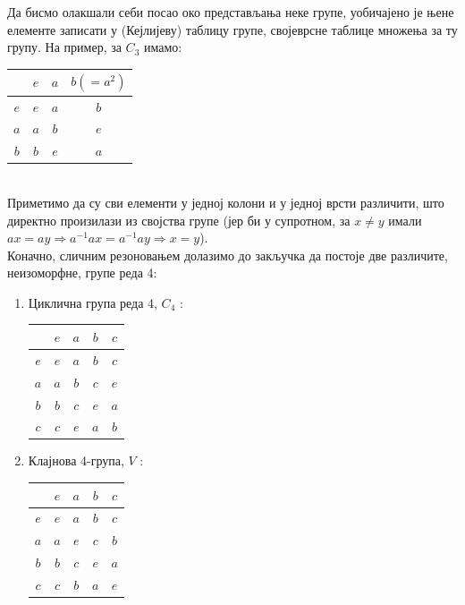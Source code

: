 \documentclass{report}
\theoremstyle{plain}
\theoremstyle{definition}
\begin{document}
Да бисмо олакшали себи посао око представљања неке групе, уобичајено је њене елементе записати у (Кејлијеву) таблицу групе, својеврсне таблице множења за ту групу. На пример, за $C_3$ имамо:\\

\begin{tabular}{c|c c c}
      & $e$ & $a$ & $b(=a^2)$ \\ \hline
  $e$ & $e$ & $a$ & $b$ \\
  $a$ & $a$ & $b$ & $e$ \\
  $b$ & $b$ & $e$ & $a$ \\
\end{tabular}\\

Приметимо да су сви елементи у једној колони и у једној врсти различити, што директно произилази из својства групе (јер би у супротном, за $x\neq y$ имали $ax = ay \Rightarrow a^{-1}ax = a^{-1}ay \Rightarrow x=y$).\\

Коначно, сличним резоновањем долазимо до закључка да постоје две различите, неизоморфне, групе реда 4:
\begin{enumerate}
  \item Циклична група реда 4, $C_4$ :
  \begin{tabular}{c|c c c c}
      & $e$ & $a$ & $b$ & $c$ \\ \hline
  $e$ & $e$ & $a$ & $b$ & $c$ \\
  $a$ & $a$ & $b$ & $c$ & $e$ \\
  $b$ & $b$ & $c$ & $e$ & $a$ \\
  $c$ & $c$ & $e$ & $a$ & $b$ \\
  \end{tabular}
  \item Клајнова 4-група, $V$ :
  \begin{tabular}{c|c c c c}
      & $e$ & $a$ & $b$ & $c$ \\ \hline
  $e$ & $e$ & $a$ & $b$ & $c$ \\
  $a$ & $a$ & $e$ & $c$ & $b$ \\
  $b$ & $b$ & $c$ & $e$ & $a$ \\
  $c$ & $c$ & $b$ & $a$ & $e$ \\
  \end{tabular}
\end{enumerate}
\end{document}
